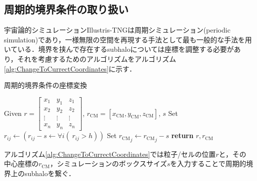 \subsection{周期的境界条件の取り扱い}

宇宙論的シミュレーションIllustris-TNGは周期シミュレーション(periodic simulation)であり，一様無限の空間を再現する手法として最も一般的な手法を用いている．境界を挟んで存在するsubhaloについては座標を調整する必要があり，それを考慮するためのアルゴリズムをアルゴリズム\ref{alg:ChangeToCurrectCoordinates}に示す．

\begin{algorithm}[H]
	\caption{周期的境界条件の座標変換}
	\label{alg:ChangeToCurrectCoordinates}
	
	\begin{algorithmic}
		\State Given $r=\begin{bmatrix}
			x_1 & y_1 & z_1 \\
			x_2 & y_2 & z_2 \\
			\vdots & \vdots & \vdots \\
			x_n & y_n & z_n
		\end{bmatrix}$, $r_\text{CM} = \left[ {x_\text{CM}}, {y_\text{CM}}, {z_\text{CM}} \right]$, $s$
			\State Set $r_{ij} \leftarrow (r_{ij} - s \leftarrow \forall i (\ r_{ij} > h))$
			\State Set ${r_\text{CM}}_{j} \leftarrow {r_\text{CM}}_{j} - s$
			\EndIf
			\EndIf
		\EndFor
		\State \textbf{return} $r, r_\text{CM}$
	\end{algorithmic}
\end{algorithm}

アルゴリズム\ref{alg:ChangeToCurrectCoordinates}では粒子/セルの位置$r$と，その中心座標の$r_\text{CM}$，シミュレーションのボックスサイズ$s$を入力することで周期的境界上のsubhaloを繋ぐ．


